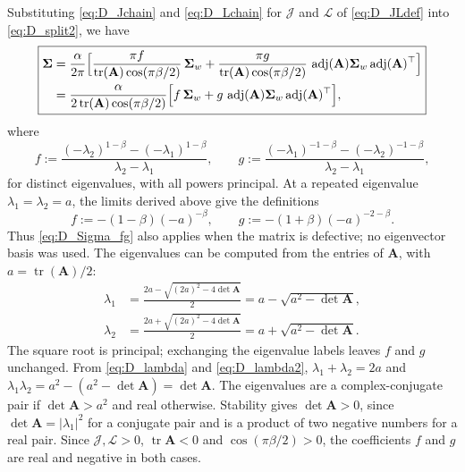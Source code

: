 \documentclass[12pt]{article}
\newcommand{\tr}{\operatorname{tr}}
\newcommand{\adj}{\operatorname{adj}}
\begin{document}
Substituting \eqref{eq:D_Jchain} and \eqref{eq:D_Lchain} for $\mathcal{J}$ and $\mathcal{L}$ of \eqref{eq:D_JLdef} into
\eqref{eq:D_split2}, we have
\begin{equation}
\boxed{
\begin{aligned}
    \boldsymbol{\Sigma}
    &=\frac{\alpha}{2\pi}\Bigl[\frac{\pi f}{\tr(\mathbf{A})\cos(\pi\beta/2)}\,\boldsymbol\Sigma_w
      +\frac{\pi g}{\tr(\mathbf{A})\cos(\pi\beta/2)}\,\adj(\mathbf{A})\boldsymbol\Sigma_w\adj(\mathbf{A})^\top\Bigr]\\
    &=\frac{\alpha}{2\tr(\mathbf{A})\cos(\pi\beta/2)}\Bigl[f\,\boldsymbol\Sigma_w+g\,\adj(\mathbf{A})\boldsymbol\Sigma_w\adj(\mathbf{A})^\top\Bigr],
\end{aligned}}
    \label{eq:D_Sigma_fg}
\end{equation}
where
\begin{equation}
    f:=\frac{(-\lambda_2)^{1-\beta}-(-\lambda_1)^{1-\beta}}{\lambda_2-\lambda_1},
    \qquad
    g:=\frac{(-\lambda_1)^{-1-\beta}-(-\lambda_2)^{-1-\beta}}{\lambda_2-\lambda_1},
    \label{eq:D_fgdef}
\end{equation}
for distinct eigenvalues, with all powers principal. At a repeated eigenvalue $\lambda_1=\lambda_2=a$,
the limits derived above give the definitions
\begin{equation}
    f:=-(1-\beta)(-a)^{-\beta},
    \qquad
    g:=-(1+\beta)(-a)^{-2-\beta}.
    \label{eq:D_fg_repeated}
\end{equation}
Thus \eqref{eq:D_Sigma_fg} also applies when the matrix is defective; no eigenvector basis was used.
The eigenvalues can be computed from the entries of $\mathbf A$, with $a=\tr(\mathbf{A})/2$:
\begin{align}
    \lambda_1
    &=\frac{2a-\sqrt{(2a)^2-4\det\mathbf{A}}}{2}
    =a-\sqrt{a^2-\det\mathbf{A}},
    \label{eq:D_lambda}\\
    \lambda_2
    &=\frac{2a+\sqrt{(2a)^2-4\det\mathbf{A}}}{2}
    =a+\sqrt{a^2-\det\mathbf{A}}.
    \label{eq:D_lambda2}
\end{align}
The square root is principal; exchanging the eigenvalue labels leaves $f$ and $g$ unchanged.
From \eqref{eq:D_lambda} and \eqref{eq:D_lambda2}, $\lambda_1+\lambda_2=2a$ and
$\lambda_1\lambda_2=a^2-(a^2-\det\mathbf{A})=\det\mathbf{A}$. The eigenvalues are a complex-conjugate pair if $\det\mathbf{A}>a^2$
and real otherwise. Stability gives $\det\mathbf{A}>0$, since $\det\mathbf{A}=|\lambda_1|^2$
for a conjugate pair and is a product of two negative numbers for a real pair. Since $\mathcal{J},\mathcal{L}>0$,
$\tr\mathbf{A}<0$ and $\cos(\pi\beta/2)>0$, the coefficients $f$ and $g$ are real and negative in both cases.
\end{document}
